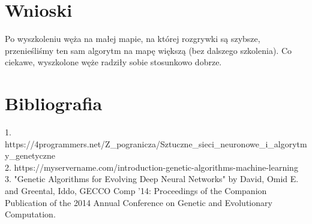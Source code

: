 \documentclass{article}
\begin{document}
\section{Wnioski} 
Po wyszkoleniu węża na małej mapie, na której rozgrywki są szybsze, przenieśliśmy ten sam algorytm na mapę większą (bez dalszego szkolenia). Co ciekawe, wyszkolone węże radziły sobie stosunkowo dobrze.
\section{Bibliografia}
1. https://4programmers.net/Z_pogranicza/Sztuczne_sieci_neuronowe_i_algorytmy_genetyczne \\
2. https://myservername.com/introduction-genetic-algorithms-machine-learning \\
3. "Genetic Algorithms for Evolving Deep Neural Networks" by David, Omid E. and Greental, Iddo, GECCO Comp '14: Proceedings of the Companion Publication of the 2014 Annual Conference on Genetic and Evolutionary Computation.
\end{document}
